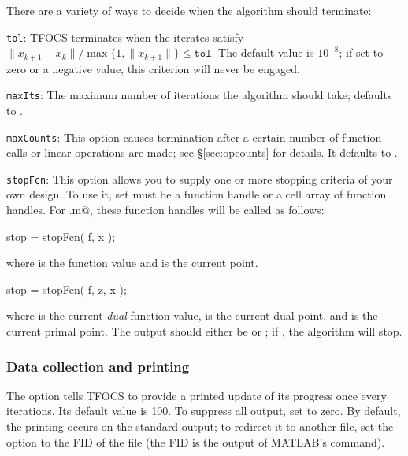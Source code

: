 \documentclass{article}
\begin{document}
There are a variety of ways to decide when the algorithm should terminate:
\begin{trivlist}
\item \texttt{tol}: TFOCS terminates when the iterates satisfy
$\|x_{k+1}-x_k\|/\max\{1,\|x_{k+1}\|\}\leq\texttt{tol}$.
The default value is $10^{-8}$; if set to zero or a negative value,
this criterion will never be engaged.
\item \texttt{maxIts}: The maximum number of iterations the algorithm
should take; defaults to \verb@Inf@.
\item \texttt{maxCounts}: This option causes termination after a certain
number of function calls or linear operations are made; see 
\S\ref{sec:opcounts}
for details. It defaults to \verb@Inf@.
\item \texttt{stopFcn}: This option allows you to supply one or more
stopping criteria of your own design. To use it, set \verb@stopFcn@
must be a function handle or a cell array of function handles. For
\verb@tfocs.m@, these function handles will be called as follows:
\begin{code}
	stop = stopFcn( f, x );
\end{code}
where \verb@f@ is the function value and \verb@x@ is the current point.
\begin{code}
	stop = stopFcn( f, z, x );
\end{code}
where \verb@f@ is the current \emph{dual} function value, \verb@z@ is
the current dual point, and  \verb@x@ is the current primal point.
The output should either be  \verb@true@ or \verb@false@; if
\verb@true@, the algorithm will stop.
\end{trivlist}

\subsubsection{Data collection and printing}
\label{sec:data}

The \verb@printEvery@ option tells TFOCS to provide a printed  update
of its progress once every \verb@printEvery@ iterations. Its default
value is 100. To suppress all output, set \verb@printEvery@ to zero.
By default, the printing occurs on the standard output; to redirect
it to another file, set the \verb@fid@ option to the FID of the
file (the FID is the output of MATLAB's \verb@fopen@ command).
\end{document}
